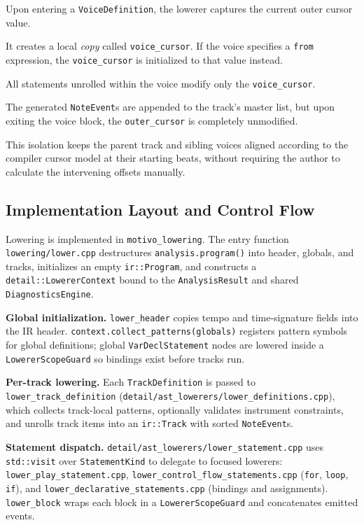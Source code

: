 \noindent Upon entering a \texttt{VoiceDefinition}, the lowerer captures the current outer cursor value.

\noindent It creates a local \textit{copy} called \texttt{voice\_cursor}.
If the voice specifies a \texttt{from} expression, the \texttt{voice\_cursor} is initialized to that value instead.

\noindent All statements unrolled within the voice modify only the \texttt{voice\_cursor}.

\noindent The generated \texttt{NoteEvent}s are appended to the track's master list, but upon exiting the
voice block, the
\texttt{outer\_cursor} is completely unmodified.

This isolation keeps the parent track and sibling voices aligned according to the compiler cursor model at
their starting beats, without requiring the author to calculate the intervening offsets manually.

\subsection{Implementation Layout and Control Flow}\label{detail-subsec:lowering-implementation-layout}

Lowering is implemented in \texttt{motivo\_lowering}.
The entry function \texttt{lowering/lower.cpp} destructures \texttt{analysis.program()} into header, globals, and
tracks, initializes an empty \texttt{ir::Program}, and constructs a \texttt{detail::LowererContext} bound to the
\texttt{AnalysisResult} and shared \texttt{DiagnosticsEngine}.

\noindent \textbf{Global initialization.} \texttt{lower\_header} copies tempo and time-signature fields into the IR
header.
\texttt{context.collect\_patterns(globals)} registers pattern symbols for global definitions; global
\texttt{VarDeclStatement} nodes are lowered inside a \texttt{LowererScopeGuard} so bindings exist before tracks run.

\noindent \textbf{Per-track lowering.} Each \texttt{TrackDefinition} is passed to \texttt{lower\_track\_definition}
(\texttt{detail/ast\_lowerers/lower\_definitions.cpp}), which collects track-local patterns, optionally validates
instrument constraints, and unrolls track items into an \texttt{ir::Track} with sorted \texttt{NoteEvent}s.

\noindent \textbf{Statement dispatch.} \texttt{detail/ast\_lowerers/lower\_statement.cpp} uses \texttt{std::visit} over
\texttt{StatementKind} to delegate to focused lowerers: \texttt{lower\_play\_statement.cpp},
\texttt{lower\_control\_flow\_statements.cpp} (\texttt{for}, \texttt{loop}, \texttt{if}), and
\texttt{lower\_declarative\_statements.cpp} (bindings and assignments).
\texttt{lower\_block} wraps each block in a \texttt{LowererScopeGuard} and concatenates emitted events.


